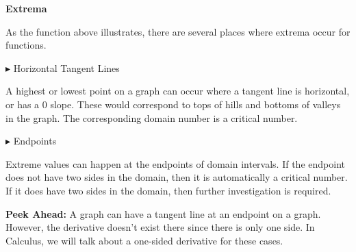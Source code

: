 \documentclass{ximera}
\begin{document}
\begin{template} \textbf{\textcolor{blue!55!black}{Extrema}} 

As the function above illustrates, there are several places where extrema occur for functions.


\textbf{\textcolor{red!70!darkgray}{$\blacktriangleright$}} Horizontal Tangent Lines 

A highest or lowest point on a graph can occur where a tangent line is horizontal, or has a $0$ slope.  These would correspond to tops of hills and bottoms of valleys in the graph. The corresponding domain number is a critical number. 




\textbf{\textcolor{red!70!darkgray}{$\blacktriangleright$}} Endpoints 

Extreme values can happen at the endpoints of domain intervals. If the endpoint does not have two sides in the domain, then it is automatically a critical number.  If it does have two sides in the domain, then further investigation is required. 

\textbf{\textcolor{red!70!darkgray}{Peek Ahead:}} A graph can have a tangent line at an endpoint on a graph.  However, the derivative doesn't exist there since there is only one side.  In Calculus, we will talk about a one-sided derivative for these cases. 

\end{template}
\end{document}
